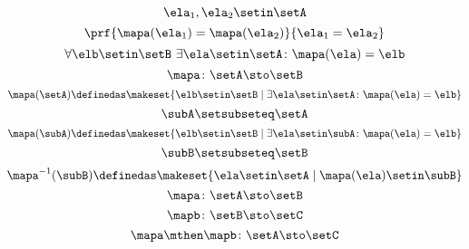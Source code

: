 {\begin{forslides}
    \begin{equation}
        \label{eq:slides_session2_122}
        \ela_1, \ela_2 \setin\setA
    \end{equation}
    \begin{equation}
        \label{eq:slides_session2_123}
        \prf{\mapa(\ela_1) = \mapa(\ela_2)}{\ela_1 = \ela_2}
    \end{equation}
    \begin{equation}
        \label{eq:slides_session2_124}
        \forall \elb \setin\setB \ \exists  \ela \setin\setA \colon \mapa(\ela) = \elb
    \end{equation}
    \begin{equation}
        \label{eq:slides_session2_125}
        \mapa\colon \setA \sto \setB
    \end{equation}
    \begin{equation}
        \label{eq:slides_session2_126}
        \mapa(\setA) \definedas \makeset{ \elb \setin\setB \mid \exists \ela \setin\setA \colon \mapa(\ela) = \elb }
    \end{equation}
    \begin{equation}
        \label{eq:slides_session2_127}
        \subA \setsubseteq \setA
    \end{equation}
    \begin{equation}
        \label{eq:slides_session2_128}
        \mapa(\subA) \definedas \makeset{ \elb \setin\setB \mid \exists \ela \setin \subA \colon \mapa(\ela) = \elb }
    \end{equation}
    \begin{equation}
        \label{eq:slides_session2_129}
        \subB \setsubseteq \setB
    \end{equation}
    \begin{equation}
        \label{eq:slides_session2_130}
        \mapa^{-1}(\subB) \definedas \makeset{ \ela \setin\setA \mid  \mapa(\ela) \setin \subB}
    \end{equation}
    \begin{equation}
        \label{eq:slides_session2_131}
        \mapa\colon \setA \sto \setB
    \end{equation}
    \begin{equation}
        \label{eq:slides_session2_132}
        \mapb \colon \setB \sto \setC
    \end{equation}
    \begin{equation}
        \label{eq:slides_session2_133}
        \mapa \mthen \mapb \colon \setA \sto \setC
    \end{equation}

\end{forslides}}
